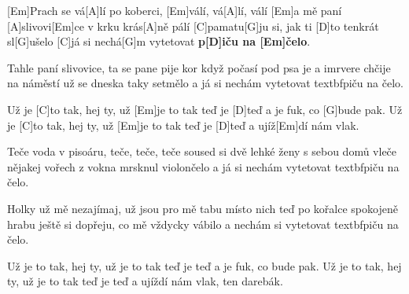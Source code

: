 
[Em]Prach se vá[A]lí po koberci, [Em]válí, vá[A]lí, válí
[Em]a mě paní [A]slivovi[Em]ce v krku krás[A]ně pálí
[C]pamatu[G]ju si, jak ti [D]to tenkrát sl[G]ušelo
[C]já si nechá[G]m vytetovat \textbf{p[D]iču na [Em]\null čelo}.

Tahle paní slivovice, ta se pane pije
kor když počasí pod psa je a imrvere chčije
na náměstí už se dneska taky setmělo
a já si nechám vytetovat textbf{piču na čelo}.

Už je [C]to tak, hej ty, už [Em]je to tak
teď je [D]teď a je fuk, co [G]bude pak.
Už je [C]to tak, hej ty, už [Em]je to tak
teď je [D]teď a ujíž[Em]dí nám vlak.

Teče voda v pisoáru, teče, teče, teče
soused si dvě lehké ženy s sebou domů vleče
nějakej vořech z vokna mrsknul violončelo
a já si nechám vytetovat textbf{piču na čelo}.

Holky už mě nezajímaj, už jsou pro mě tabu
místo nich teď po kořalce spokojeně hrabu
ještě si dopřeju, co mě vždycky vábilo
a nechám si vytetovat textbf{piču na čelo}.

Už je to tak, hej ty, už je to tak
teď je teď a je fuk, co bude pak.
Už je to tak, hej ty, už je to tak
teď je teď a ujíždí nám vlak, ten darebák.